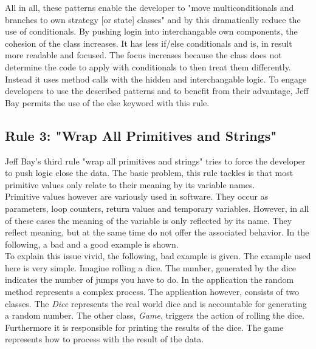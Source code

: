  All in all, these patterns enable the developer to "move multiconditionals and branches to own strategy [or state] classes" \cite[p. 350]{gof} and by this dramatically reduce the use of conditionals. By pushing login into interchangable own components, the cohesion of the class increases. It has less if/else conditionals and is, in result more readable and focused. The focus increases because the class does not determine the code to apply with conditionals to then treat them differently. Instead it uses method calls with the hidden and interchangable logic. To engage developers to use the described patterns and to benefit from their advantage, Jeff Bay permits the use of the else keyword with this rule. 

\subsection*{Rule 3: "Wrap All Primitives and Strings"}
Jeff Bay's third rule "wrap all primitives and strings" tries to force the developer to push logic close the data. The basic problem, this rule tackles is that most primitive values only relate to their meaning by its variable names. 
\\

Primitive values however are variously used in software. They occur as parameters, loop counters, return values and temporary variables. However, in all of these cases the meaning of the variable is only reflected by its name. They reflect meaning, but at the same time do not offer the associated behavior. In the following, a bad and a good example is shown. 
\\

To explain this issue vivid, the following, bad example is given. The example used here is very simple. Imagine rolling a dice. The number, generated by the dice indicates the number of jumps you have to do. In the application the random method represents a complex process. The application however, consists of two classes. The \textit{Dice} represents the real world dice and is accountable for generating a random number. The other class, \textit{Game}, triggers the action of rolling the dice. Furthermore it is responsible for printing the results of the dice. The game represents how to process with the result of the data.   
\\

